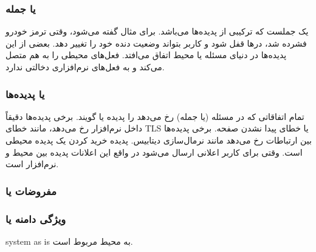 \subsubsection{ یا جمله}

 یک جملست که ترکیبی از پدیده‌ها می‌باشد. برای مثال گفته می‌شود،
وقتی ترمز خودرو فشرده شد، در‌ها قفل شود و کاربر بتواند وضعیت دنده خود را تغییر
دهد. بعضی از این پدیده‌ها در دنیای مسئله یا محیط اتفاق می‌افتد. فعل‌های محیطی را
به هم متصل می‌کند و به فعل‌های نرم‌افزاری دخالتی ندارد.

\subsubsection{ یا پدیده‌ها}

تمام اتفاقاتی که در مسئله (یا جمله) رخ می‌دهد را پدیده یا  گویند.
برخی پدیده‌ها دقیقاً داخل نرم‌افزار رخ می‌دهد، مانند خطای TLS یا خطای پیدا نشدن
صفحه. برخی پدیده‌ها بین ارتباطات رخ می‌دهد مانند نرمال‌سازی دیتابیس. پدیده خرید
کردن یک پدیده محیطی است. وقتی برای کاربر اعلانی ارسال می‌شود در واقع این اعلانات
پدیده‌ بین محیط و نرم‌افزار است.

\subsubsection{}

\subsubsection{}

\subsubsection{مفروضات یا }


\subsubsection{ویژگی دامنه یا }






system as is به محیط مربوط است.


